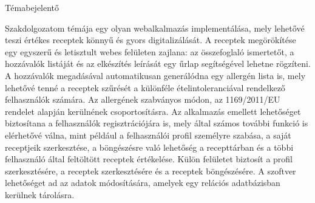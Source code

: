 {\Huge{Témabejelentő}}

Szakdolgozatom témája egy olyan webalkalmazás implementálása, mely lehetővé teszi értékes receptek könnyű és gyors digitalizálását. A receptek megörökítése
egy egyszerű és letisztult webes felületen zajlana: az összefoglaló ismertetőt, a hozzávalók listáját és az elkészítés leírását egy űrlap segítségével lehetne rögzíteni. A
hozzávalók megadásával automatikusan generálódna egy allergén lista is, mely lehetővé tenné a receptek szűrését a különféle ételintoleranciával rendelkező felhasználók
számára. Az allergének szabványos módon, az 1169/2011/EU rendelet alapján kerülnének csoportosításra. Az alkalmazás emellett lehetőséget biztosítana a felhasználók
regisztrációjára is, mely által számos további funkció is elérhetővé válna, mint például a felhasználói profil személyre szabása, a saját receptjeik szerkesztése, a
böngészésre való lehetőség a recepttárban és a többi felhasználó által feltöltött receptek értékelése. Külön felületet biztosít a profil szerkesztésére, a receptek
szerkesztésére és a receptek böngészésére. A szoftver lehetőséget ad az adatok módosítására, amelyek egy relációs adatbázisban kerülnek tárolásra.